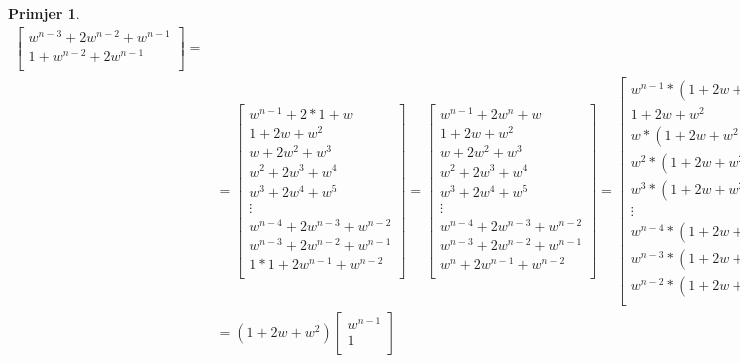 \documentclass[11pt]{article}
\newtheorem{example}{Primjer}
\begin{document}
\begin{example}
\[\begin{split}
\begin{bmatrix}
		w^{n-3} + 2w^{n-2} + w^{n-1} \\
		1 + w^{n-2} + 2w^{n-1} \\
		\end{bmatrix} = \\
	 	 & =  
		\begin{bmatrix}
		 w^{n-1} + 2 * 1 + w \\
		1 + 2w + w^2       \\
		w + 2w^2 + w^3       \\
		w^2 + 2w^3 + w^4  \\
		w^3 + 2w^4 + w^5  \\
		\vdots \\
		w^{n-4} + 2w^{n-3} + w^{n-2} \\
		w^{n-3} + 2w^{n-2} + w^{n-1} \\
		1 * 1 + 2w^{n-1} + w^{n-2} \\
		\end{bmatrix}
		= 
		\begin{bmatrix}
		w^{n-1} + 2 w^n + w \\
		1 + 2w + w^2       \\
		w + 2w^2 + w^3       \\
		w^2 + 2w^3 + w^4  \\
		w^3 + 2w^4 + w^5  \\
		\vdots \\
		w^{n-4} + 2w^{n-3} + w^{n-2} \\
		w^{n-3} + 2w^{n-2} + w^{n-1} \\
		w^n + 2w^{n-1} + w^{n-2} \\
		\end{bmatrix}
		= 
		\begin{bmatrix}
		w^{n-1} * ( 1+ 2 w + w^2) \\
		1 + 2w + w^2       \\
		w * (1 + 2w + w^2)       \\
		w^2 * (1 + 2w + w^2)       \\
		w^3 * (1 + 2w + w^2)       \\
		\vdots \\
		w^{n-4} * (1 + 2w + w^2)       \\
		w^{n-3} * (1 + 2w + w^2)       \\
		w^{n-2} * (1 + 2w + w^2)       \\
		\end{bmatrix} = \\
		& = (1 + 2w + w^2)
		\begin{bmatrix}
		w^{n-1}  \\
		1        \\

\end{bmatrix}
\end{split}\]
\end{example}
\end{document}
